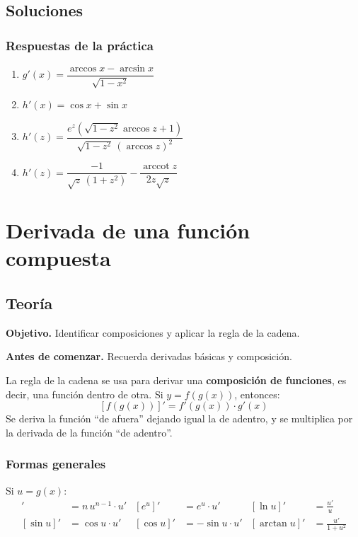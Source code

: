 \documentclass[12pt]{article}
\begin{document}
\subsection{Soluciones}

\subsubsection{Respuestas de la práctica}


\begin{enumerate}
    \item $g'(x) = \dfrac{\arccos x - \arcsin x}{\sqrt{1 - x^2}}$
    \item $h'(x) = \cos x + \sin x$
    \item $h'(z) = \dfrac{e^z\left(\sqrt{1 - z^2}\arccos z + 1\right)}{\sqrt{1 - z^2}\,(\arccos z)^2}$
    \item $h'(z) = \dfrac{-1}{\sqrt{z}\,(1 + z^2)} - \dfrac{\operatorname{arccot} z}{2z\sqrt{z}}$
\end{enumerate}



\section{Derivada de una función compuesta}

\subsection{Teoría}

\textbf{Objetivo.} Identificar composiciones y aplicar la regla de la cadena.

\textbf{Antes de comenzar.} Recuerda derivadas básicas y composición.


La regla de la cadena se usa para derivar una \textbf{composición de funciones}, es decir, una función dentro de otra. Si $y = f(g(x))$, entonces:
\[
[f(g(x))]' = f'(g(x)) \cdot g'(x)
\]
Se deriva la función ``de afuera'' dejando igual la de adentro, y se multiplica por la derivada de la función ``de adentro''.



\subsubsection{Formas generales}


Si $u = g(x)$:
\begin{align*}
[u^n]' &= n\,u^{n-1} \cdot u' & [e^u]' &= e^u \cdot u' & [\ln u]' &= \frac{u'}{u} \\
[\sin u]' &= \cos u \cdot u' & [\cos u]' &= -\sin u \cdot u' & [\arctan u]' &= \frac{u'}{1 + u^2}
\end{align*}
\end{document}
